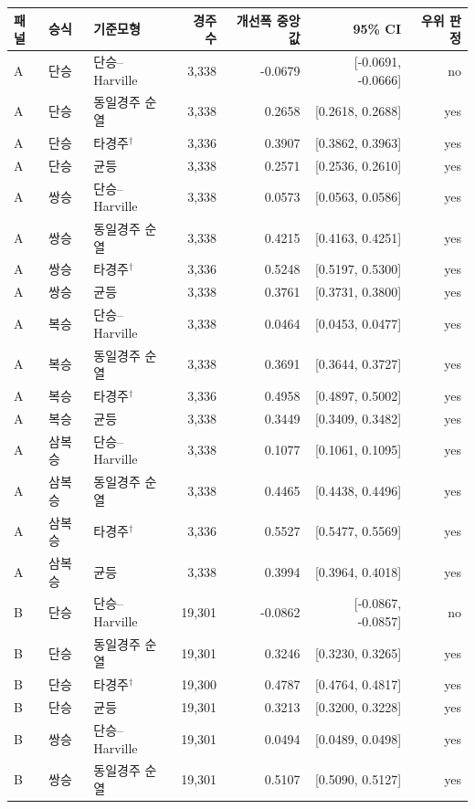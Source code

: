 \begin{tabular}{lllrrrr}
\toprule
패널 & 승식 & 기준모형 & 경주 수 & 개선폭 중앙값 & 95\% CI & 우위 판정 \\
\midrule
A & 단승 & 단승--Harville & 3,338 & -0.0679 & [-0.0691, -0.0666] & no \\
A & 단승 & 동일경주 순열 & 3,338 & 0.2658 & [0.2618, 0.2688] & yes \\
A & 단승 & 타경주$^{\dagger}$ & 3,336 & 0.3907 & [0.3862, 0.3963] & yes \\
A & 단승 & 균등 & 3,338 & 0.2571 & [0.2536, 0.2610] & yes \\
A & 쌍승 & 단승--Harville & 3,338 & 0.0573 & [0.0563, 0.0586] & yes \\
A & 쌍승 & 동일경주 순열 & 3,338 & 0.4215 & [0.4163, 0.4251] & yes \\
A & 쌍승 & 타경주$^{\dagger}$ & 3,336 & 0.5248 & [0.5197, 0.5300] & yes \\
A & 쌍승 & 균등 & 3,338 & 0.3761 & [0.3731, 0.3800] & yes \\
A & 복승 & 단승--Harville & 3,338 & 0.0464 & [0.0453, 0.0477] & yes \\
A & 복승 & 동일경주 순열 & 3,338 & 0.3691 & [0.3644, 0.3727] & yes \\
A & 복승 & 타경주$^{\dagger}$ & 3,336 & 0.4958 & [0.4897, 0.5002] & yes \\
A & 복승 & 균등 & 3,338 & 0.3449 & [0.3409, 0.3482] & yes \\
A & 삼복승 & 단승--Harville & 3,338 & 0.1077 & [0.1061, 0.1095] & yes \\
A & 삼복승 & 동일경주 순열 & 3,338 & 0.4465 & [0.4438, 0.4496] & yes \\
A & 삼복승 & 타경주$^{\dagger}$ & 3,336 & 0.5527 & [0.5477, 0.5569] & yes \\
A & 삼복승 & 균등 & 3,338 & 0.3994 & [0.3964, 0.4018] & yes \\
B & 단승 & 단승--Harville & 19,301 & -0.0862 & [-0.0867, -0.0857] & no \\
B & 단승 & 동일경주 순열 & 19,301 & 0.3246 & [0.3230, 0.3265] & yes \\
B & 단승 & 타경주$^{\dagger}$ & 19,300 & 0.4787 & [0.4764, 0.4817] & yes \\
B & 단승 & 균등 & 19,301 & 0.3213 & [0.3200, 0.3228] & yes \\
B & 쌍승 & 단승--Harville & 19,301 & 0.0494 & [0.0489, 0.0498] & yes \\
B & 쌍승 & 동일경주 순열 & 19,301 & 0.5107 & [0.5090, 0.5127] & yes \\

\end{tabular}
